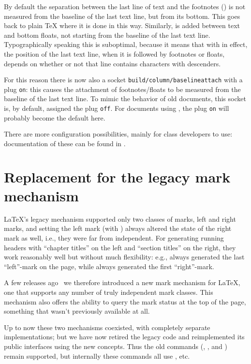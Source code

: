 \documentclass{ltnews}
\providecommand\socket[1]{\texttt{#1}}
\providecommand\plug[1]{\texttt{#1}}
\begin{document}
By default the separation between the last line of text and the
footnotes () is not measured from the baseline of
the last text line, but from its bottom. This goes back to plain
\TeX{} where it is done in this way.  Similarly,  is
added between text and bottom floats, not starting from the baseline of
the last text line. Typographically speaking this is suboptimal,
because it means that with  in effect, the position of
the last text line, when it is followed by footnotes or floats,
depends on whether or not that line contains characters with
descenders.

For this reason there is now also a socket
\socket{build/column/baselineattach} with a plug \plug{on}: this
causes the attachment of footnotes/floats to be measured from the
baseline of the last text line. To mimic the behavior of old
documents, this socket is, by default, assigned the plug \plug{off}.
For documents using , the plug \plug{on} will
probably become the default here.

There are more configuration possibilities, mainly for class
developers to use: documentation of these can be found in \cite[\S54
  \texttt{ltoutput.dtx}]{41:source2e}.


\section{Replacement for the legacy mark mechanism}

\LaTeX{}'s legacy mechanism supported only two classes of marks, left
and right marks, and setting the left mark (with ) always
altered the state of the right mark as well, i.e., they were far from
independent. For generating running headers with \enquote{chapter
  titles} on the left and \enquote{section titles} on the right, they
work reasonably well but without much flexibility: e.g., 
always generated the last \enquote{left}-mark on the page, while
 always generated the first \enquote{right}-mark.

A few releases ago~\cite[p.\,76]{41:ltnews} we therefore introduced a
new mark mechanism for \LaTeX{}, one that supports any number of truly
independent mark classes. This mechanism also offers the ability to
query the mark status at the top of the page, something that wasn't
previously available at all.

Up to now these two mechanisms coexisted, with completely separate
implementations; but we have now retired the legacy code and
reimplemented its public interfaces using the new concepts.  Thus
the old commands (, ,  and
) remain supported, but internally these commands all
use , etc.
\end{document}
